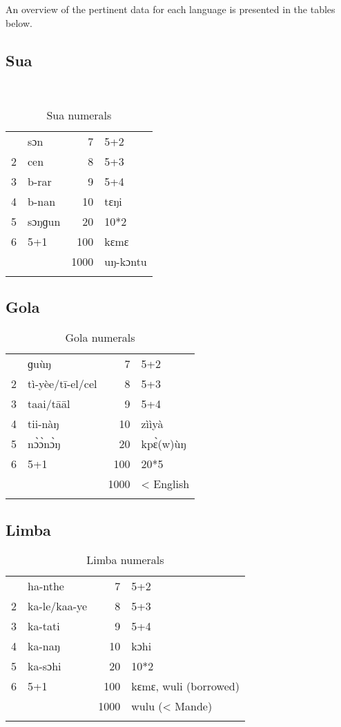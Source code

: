 An overview of the pertinent data for each language is presented in the tables below.

\newpage 
\subsection{Sua}%
~\vspace*{-\baselineskip}
\begin{table}[h]
\caption{\label{tab:3:248}Sua numerals}
\begin{tabularx}{.66\textwidth}{lQrl}
 & sɔn & 7 & 5+2\\
2 & cen & 8 & 5+3\\
3 & b-rar & 9 & 5+4\\
4 & b-nan & 10 & tɛŋi\\
5 & sɔŋɡun & 20 & 10*2\\
6 & 5+1 & 100 & kɛmɛ\\
&  & 1000 & uŋ-kɔntu\\
\lspbottomrule
\end{tabularx}
\end{table}


\subsection{Gola}%
\begin{table}
\caption{\label{tab:3:249}Gola numerals}


\begin{tabularx}{.66\textwidth}{lQrl}
 & ɡuùŋ & 7 & 5+2\\
2 & tì-yèe/tī-el/cel & 8 & 5+3\\
3 & taai/tāāl & 9 & 5+4\\
4 & tii-nàŋ & 10 & zììyà\\
5 & n{\`{ɔ}}{\`{ɔ}}n{\`{ɔ}}ŋ & 20 & kp{\`{ɛ}}(w)ùŋ\\
6 & 5+1 & 100 & 20*5\\
&  & 1000 & < English\\
\lspbottomrule
\end{tabularx}
\end{table}

\largerpage[3] 
\subsection{Limba}%
\begin{table}[h]
\caption{\label{tab:3:250}Limba numerals}
\begin{tabularx}{.66\textwidth}{lQrl}
 & ha-nthe & 7 & 5+2\\
2 & ka-le/kaa-ye & 8 & 5+3\\
3 & ka-tati & 9 & 5+4\\
4 & ka-naŋ & 10 & kɔhi\\
5 & ka-sɔhi & 20 & 10*2\\
6 & 5+1 & 100 & kɛmɛ, wuli (borrowed)\\
&  & 1000 & wulu (< Mande)\\
\lspbottomrule
\end{tabularx}
\end{table}


